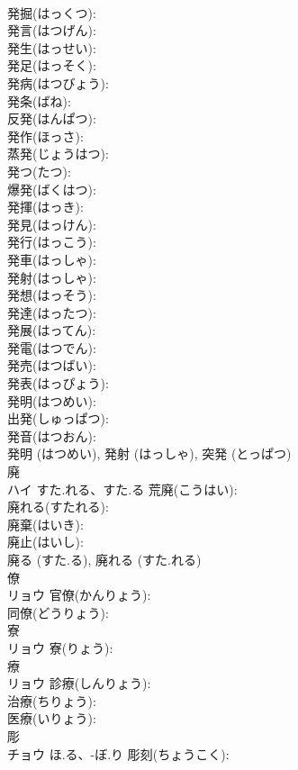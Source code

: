 \documentclass[8pt]{extreport}
\begin{document}
\begin{CJK}{UTF8}{min}
\\	発掘(はっくつ): 
\\	発言(はつげん): 
\\	発生(はっせい): 
\\	発足(はっそく): 
\\	発病(はつびょう): 
\\	発条(ばね): 
\\	反発(はんぱつ): 
\\	発作(ほっさ): 
\\	蒸発(じょうはつ): 
\\	発つ(たつ): 
\\	爆発(ばくはつ): 
\\	発揮(はっき): 
\\	発見(はっけん): 
\\	発行(はっこう): 
\\	発車(はっしゃ): 
\\	発射(はっしゃ): 
\\	発想(はっそう): 
\\	発達(はったつ): 
\\	発展(はってん): 
\\	発電(はつでん): 
\\	発売(はつばい): 
\\	発表(はっぴょう): 
\\	発明(はつめい): 
\\	出発(しゅっぱつ): 
\\	発音(はつおん): 
\\	発明 (はつめい), 発射 (はっしゃ), 突発 (とっぱつ)
\\	廃			
\\	ハイ	すた.れる、すた.る	荒廃(こうはい): 
\\	廃れる(すたれる): 
\\	廃棄(はいき): 
\\	廃止(はいし): 
\\	廃る (すた.る), 廃れる (すた.れる)
\\	僚			
\\	リョウ		官僚(かんりょう): 
\\	同僚(どうりょう): 
\\	寮			
\\	リョウ		寮(りょう): 
\\	療			
\\	リョウ		診療(しんりょう): 
\\	治療(ちりょう): 
\\	医療(いりょう): 
\\	彫			
\\	チョウ	ほ.る、-ぼ.り	彫刻(ちょうこく): 

\end{CJK}
\end{document}
